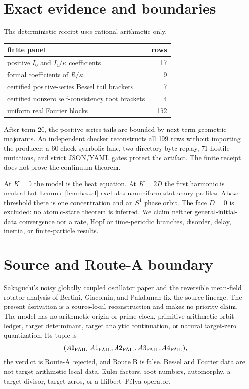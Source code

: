 \documentclass[10pt]{article}
\theoremstyle{remark}
\begin{document}
\section{Exact evidence and boundaries}

The deterministic receipt uses rational arithmetic only.
\begin{center}
\begin{tabular}{lr}
\toprule
finite panel & rows\\
\midrule
positive \(I_0\) and \(I_1/\kappa\) coefficients & 17\\
formal coefficients of \(R/\kappa\) & 9\\
certified positive-series Bessel tail brackets & 7\\
certified nonzero self-consistency root brackets & 4\\
uniform real Fourier blocks & 162\\
\bottomrule
\end{tabular}
\end{center}
After term 20, the positive-series tails are bounded by next-term geometric
majorants.  An independent checker reconstructs all 199 rows without
importing the producer; a 60-check symbolic lane, two-directory byte replay,
71 hostile mutations, and strict JSON/YAML gates protect the artifact.  The
finite receipt does not prove the continuum theorem.

At \(K=0\) the model is the heat equation.  At \(K=2D\) the first harmonic
is neutral but Lemma~\ref{lem:bessel} excludes nonuniform stationary
profiles.  Above threshold there is one concentration and an \(S^1\) phase
orbit.  The face \(D=0\) is excluded: no atomic-state theorem is inferred.
We claim neither general-initial-data convergence nor a rate, Hopf or
time-periodic branches, disorder, delay, inertia, or finite-particle results.

\section{Source and Route-A boundary}

Sakaguchi's noisy globally coupled oscillator paper\cite{sakaguchi} and the
reversible mean-field rotator analysis of Bertini, Giacomin, and
Pakdaman\cite{bertini} fix the source lineage.  The present derivation is a
source-local reconstruction and makes no priority claim.  The model has no
arithmetic origin or prime clock, primitive arithmetic orbit ledger, target
determinant, target analytic continuation, or natural target-zero
quantization.  Its tuple is
\[
 (A0_{\rm FAIL},A1_{\rm FAIL},A2_{\rm FAIL},A3_{\rm FAIL},A4_{\rm FAIL}),
\]
the verdict is Route-A rejected, and Route B is false.  Bessel and Fourier
data are not target arithmetic local data, Euler factors, root numbers,
automorphy, a target divisor, target zeros, or a Hilbert--P\'olya operator.
\end{document}

